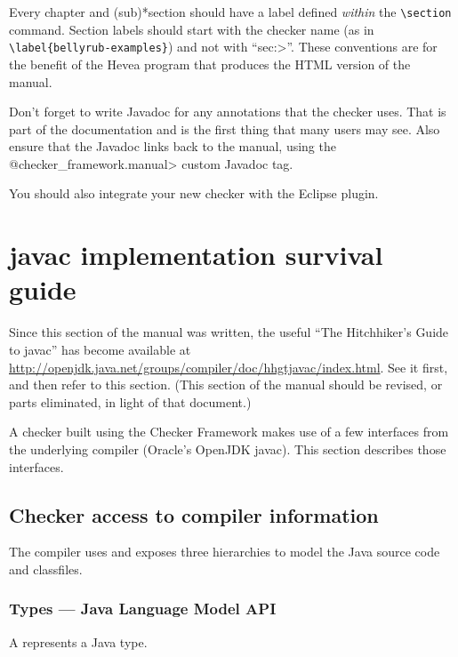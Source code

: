 Every chapter and (sub)*section should have a label defined \emph{within} the
\verb|\section| command.  Section labels should start with the checker
name (as in \verb|\label{bellyrub-examples}|) and not with ``\<sec:>''.
These conventions are for the benefit of the Hevea program that produces
the HTML version of the manual.

Don't forget to write Javadoc for any annotations that the checker uses.
That is part of the documentation and is the first thing that many users
may see.  Also ensure that the Javadoc links back to the manual, using the
\<@checker\_framework.manual> custom Javadoc tag.

You should also integrate your new checker with the Eclipse plugin.


\section{javac implementation survival guide\label{javac-tips}}

Since this section of the manual was written, the useful ``The Hitchhiker's
Guide to javac'' has become available at
\url{http://openjdk.java.net/groups/compiler/doc/hhgtjavac/index.html}.
See it first, and then refer to this section.  (This section of the manual
should be revised, or parts eliminated, in light of that document.)


A checker built using the Checker Framework makes use of a few interfaces
from the underlying compiler (Oracle's OpenJDK javac).
This section describes those interfaces.




\subsection{Checker access to compiler information\label{compiler-information}}

The compiler uses and exposes three hierarchies to model the Java
source code and classfiles.


\subsubsection{Types --- Java Language Model API\label{javac-types}}

A  represents a Java type.

